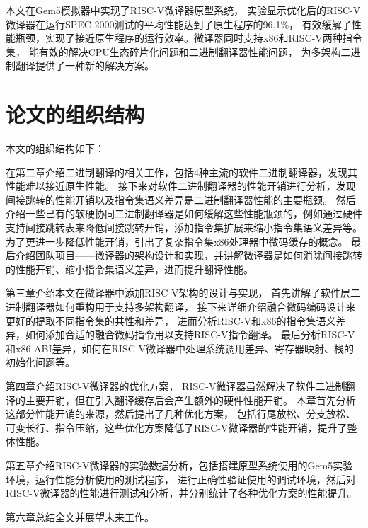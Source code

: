 本文在Gem5模拟器中实现了RISC-V微译器原型系统，
实验显示优化后的RISC-V微译器在运行SPEC 2000测试的平均性能达到了原生程序的96.1\%，
有效缓解了性能瓶颈，实现了接近原生程序的运行效率。微译器同时支持x86和RISC-V两种指令集，
能有效的解决CPU生态碎片化问题和二进制翻译器性能问题，
为多架构二进制翻译提供了一种新的解决方案。

\section{论文的组织结构}

本文的组织结构如下：

在第二章介绍二进制翻译的相关工作，包括4种主流的软件二进制翻译器，发现其性能难以接近原生性能。
接下来对软件二进制翻译器的性能开销进行分析，发现间接跳转的性能开销以及指令集语义差异是二进制翻译器性能的主要瓶颈。
然后介绍一些已有的软硬协同二进制翻译器是如何缓解这些性能瓶颈的，例如通过硬件支持间接跳转表来降低间接跳转开销，添加指令集扩展来缩小指令集语义差异等。
为了更进一步降低性能开销，引出了复杂指令集x86处理器中微码缓存的概念。
最后介绍团队项目——微译器的架构设计和实现，并讲解微译器是如何消除间接跳转的性能开销、缩小指令集语义差异，进而提升翻译性能。

第三章介绍本文在微译器中添加RISC-V架构的设计与实现，
首先讲解了软件层二进制翻译器如何重构用于支持多架构翻译，
接下来详细介绍融合微码编码设计来更好的提取不同指令集的共性和差异，
进而分析RISC-V和x86的指令集语义差异，如何添加合适的融合微码指令用以支持RISC-V指令翻译。
最后分析RISC-V和x86 ABI差异，如何在RISC-V微译器中处理系统调用差异、寄存器映射、栈的初始化问题等。

第四章介绍RISC-V微译器的优化方案，
RISC-V微译器虽然解决了软件二进制翻译的主要开销，但在引入翻译缓存后会产生额外的硬件性能开销。
本章首先分析这部分性能开销的来源，然后提出了几种优化方案，
包括行尾放松、分支放松、可变长行、指令压缩，这些优化方案降低了RISC-V微译器的性能开销，提升了整体性能。

第五章介绍RISC-V微译器的实验数据分析，包括搭建原型系统使用的Gem5实验环境，运行性能分析使用的测试程序，
进行正确性验证使用的调试环境，然后对RISC-V微译器的性能进行测试和分析，并分别统计了各种优化方案的性能提升。

第六章总结全文并展望未来工作。
